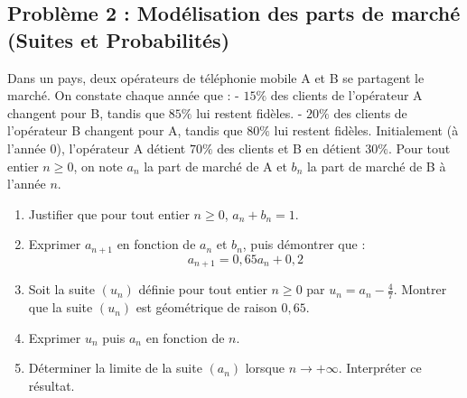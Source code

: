 \subsection*{Problème 2 : Modélisation des parts de marché (Suites et Probabilités)}
Dans un pays, deux opérateurs de téléphonie mobile A et B se partagent le marché. On constate chaque année que :
- $15\%$ des clients de l'opérateur A changent pour B, tandis que $85\%$ lui restent fidèles.
- $20\%$ des clients de l'opérateur B changent pour A, tandis que $80\%$ lui restent fidèles.
Initialement (à l'année 0), l'opérateur A détient $70\%$ des clients et B en détient $30\%$.
Pour tout entier $n \ge 0$, on note $a_n$ la part de marché de A et $b_n$ la part de marché de B à l'année $n$.
\begin{enumerate}
    \item Justifier que pour tout entier $n \ge 0$, $a_n + b_n = 1$.
    \item Exprimer $a_{n+1}$ en fonction de $a_n$ et $b_n$, puis démontrer que :
    \[
    a_{n+1} = 0,65 a_n + 0,2
    \]
    \item Soit la suite $(u_n)$ définie pour tout entier $n \ge 0$ par $u_n = a_n - \frac{4}{7}$.
    Montrer que la suite $(u_n)$ est géométrique de raison $0,65$.
    \item Exprimer $u_n$ puis $a_n$ en fonction de $n$.
    \item Déterminer la limite de la suite $(a_n)$ lorsque $n \to +\infty$. Interpréter ce résultat.
\end{enumerate}

